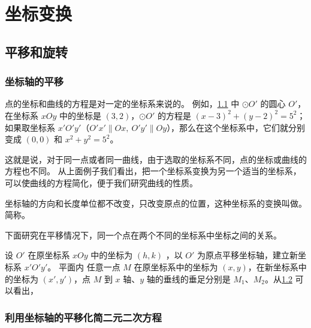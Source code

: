 \chapter{坐标变换}
\section{平移和旋转}
\subsection{坐标轴的平移}
点的坐标和曲线的方程是对一定的坐标系来说的。
例如，\cref{fig:3-1} 中 $\odot O'$ 的圆心 $O'$，在坐标系 $xOy$ 中的坐标是 $(3,2)$，$\odot O'$ 的方程是 $(x-3)^2+(y-2)^2=5^2$；如果取坐标系 $x'O'y'$（$O'x'\parallel Ox,\ O'y'\parallel Oy$），那么在这个坐标系中，它们就分别变成 $(0,0)$ 和 $x^2+y^2=5^2$。
\begin{figure}
  \caption{}\label{fig:3-1}
\end{figure}

这就是说，对于同一点或者同一曲线，由于选取的坐标系不同，点的坐标或曲线的方程也不同。
从上面例子我们看出，把一个坐标系变换为另一个适当的坐标系，可以使曲线的方程简化，便于我们研究曲线的性质。

坐标轴的方向和长度单位都不改变，只改变原点的位置，这种坐标系的变换叫做。
简称。

下面研究在平移情况下，同一个点在两个不同的坐标系中坐标之间的关系。

设 $O'$ 在原坐标系 $xOy$ 中的坐标为 $(h,k)$ ，以 $O'$ 为原点平移坐标轴，建立新坐标系 $x'O'y'$。
平面内 任意一点 $M$ 在原坐标系中的坐标为 $(x,y)$，在新坐标系中的坐标为 $(x',y')$，点 $M$ 到 $x$ 轴、$y$ 轴的垂线的垂足分别是 $M_1$、$M_2$。从\cref{fig:3-2} 可以看出，
\begin{figure}
  \caption{}\label{fig:3-2}
\end{figure}


\begin{Practice}
  \begin{question}
    \item 
    \item 
  \end{question}
\end{Practice}
\subsection{利用坐标轴的平移化简二元二次方程}
\begin{Practice}
  \begin{question}
    \item 
    \item 
  \end{question}
\end{Practice}
\begin{Exercise}
  \begin{question}
    \item 
    \item 
    \item 
    \item 
    \item 
  \end{question}
\end{Exercise}
